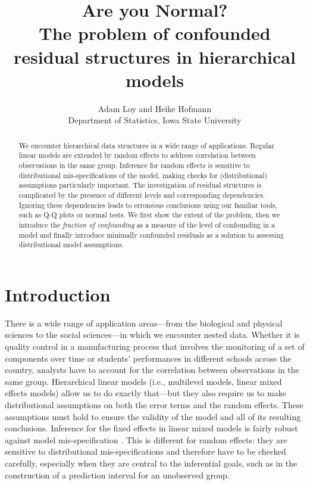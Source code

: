 \documentclass[12pt]{article} %
\title{Are you Normal? \\ {\Large The problem of confounded residual structures in hierarchical models}}
\author{
	Adam Loy and Heike Hofmann\\
	Department of Statistics,
	Iowa State University
}
\newcommand{\hh}[1]{{\color{orange} #1}}
\newcommand{\al}[1]{{\color{red} #1}}
\begin{document}
\maketitle


\begin{abstract}
We encounter hierarchical data structures in a wide range of applications. Regular linear models are extended by random effects to address correlation between observations in the same group. Inference for random effects is sensitive to  distributional mis-specifications of the model, making checks for (distributional) assumptions particularly important.  The investigation of residual structures is complicated by the presence of  different levels and corresponding  dependencies. Ignoring these dependencies leads to  erroneous conclusions using our familiar tools, such as Q-Q plots or normal tests. We first show the extent of the problem, then we introduce the {\it fraction of confounding} as a measure of the level of confounding in a model and finally introduce minimally confounded residuals as a solution to assessing distributional model assumptions.
\end{abstract}


\section{Introduction}\label{sec:intro}
There is a wide range of application areas---from the biological and physical sciences to the social sciences---in which we encounter nested  data.
Whether it is quality control in a manufacturing process that involves the monitoring of a set of components over  time  or students' performances in different schools across the country, analysts have to account for  the correlation between observations in the same group.  Hierarchical linear models \al{(i.e., multilevel models, linear mixed effects models)} allow us to do exactly that---but they also require us to make distributional assumptions on both the error terms and the random effects. These assumptions must hold to ensure the validity of the model \hh{and all of its resulting conclusions.} 
Inference for the fixed effects in linear mixed models is fairly robust against model mis-specification \citep{Butler:1992tx, Verbeke:1997tf}. This is different for random effects: they are sensitive to  distributional mis-specifications and  therefore have to be checked carefully, especially when they are central to the inferential goals, such as in the construction of a prediction interval for an unobserved group.
\end{document}
